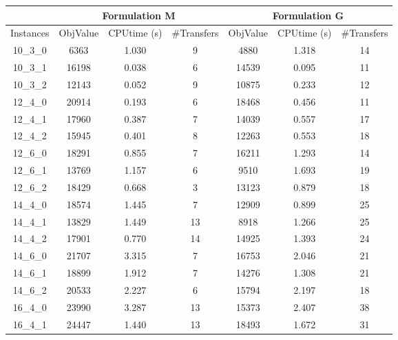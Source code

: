 \documentclass[preprint,12pt,authoryear]{elsarticle}
\begin{document}
\begin{table}[h!]
  \hspace{1.5cm}
  \vspace{0.5cm}
  \centering
{\scriptsize
        \begin{tabular}{|c||c|c|c||c|c|c|}
            \cline{2-7}
             \multicolumn{1}{c|}{} & \multicolumn{3}{|c||}{Formulation M} & \multicolumn{3}{c|}{Formulation G} \\
             \hline
            Instances  & ObjValue & CPUtime (s) & \#Transfers  & ObjValue & CPUtime (s) & \#Transfers \\ 
            \hline
10\_3\_0 &  6363 &     1.030 &        9 		&  4880 &     1.318 &       14 \\
10\_3\_1 & 16198 &     0.038 &        6 		& 14539 &     0.095 &       11 \\
10\_3\_2 & 12143 &     0.052 &        9 		& 10875 &     0.233 &       12 \\
\hline
12\_4\_0 & 20914 &     0.193 &        6 		& 18468 &     0.456 &       11 \\
12\_4\_1 & 17960 &     0.387 &        7 		& 14039 &     0.557 &       17 \\
12\_4\_2 & 15945 &     0.401 &        8 		& 12263 &     0.553 &       18 \\
12\_6\_0 & 18291 &     0.855 &        7 		& 16211 &     1.293 &       14 \\
12\_6\_1 & 13769 &     1.157 &        6 		&  9510 &     1.693 &       19 \\
12\_6\_2 & 18429 &     0.668 &        3 		& 13123 &     0.879 &       18 \\
\hline
14\_4\_0 & 18574 &     1.445 &        7 		& 12909 &     0.899 &       25 \\
14\_4\_1 & 13829 &     1.449 &       13 		&  8918 &     1.266 &       25 \\
14\_4\_2 & 17901 &     0.770 &       14 		& 14925 &     1.393 &       24 \\
14\_6\_0 & 21707 &     3.315 &        7 		& 16753 &     2.046 &       21 \\
14\_6\_1 & 18899 &     1.912 &        7 		& 14276 &     1.308 &       21 \\
14\_6\_2 & 20533 &     2.227 &        6 		& 15794 &     2.197 &       18 \\
\hline
16\_4\_0 & 23990 &     3.287 &       13 		& 15373 &     2.407 &       38 \\
16\_4\_1 & 24447 &     1.440 &       13 		& 18493 &     1.672 &       31 \\

\end{tabular}}
\end{table}
\end{document}
